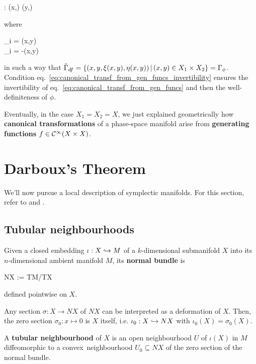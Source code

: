 \documentclass[main.tex]{subfiles}
\begin{document}
\begin{construction}
\begin{enumerate}
\begin{eqalign}
			\phi : (x,\xi) \mapsto (y,\eta)
		\end{eqalign}
		where
		\begin{eqalign}
		\label{eq:canonical_transf_from_gen_funcs}
			\begin{cases}
				\xi_i = (x,y)\\
				\eta_i = -(x,y)
			\end{cases}
		\end{eqalign}
		in such a way that $\tilde\Gamma_{df} = \{(x,y,\xi (x,y),\eta (x,y)) \,|\, (x,y) \in X_1 \times X_2\} = \Gamma_\phi$. Condition eq.~\eqref{eq:canonical_transf_from_gen_funcs_invertibility} ensures the invertibility of eq.~\eqref{eq:canonical_transf_from_gen_funcs} and then the well-definiteness of $\phi$. 
	\end{enumerate}
\end{construction}

Eventually, in the case $X_1 = X_2 = X$, we just explained geometrically how \textbf{canonical transformations} of a phase-space manifold arise from \textbf{generating functions} $f \in \mathcal{C}^\infty(X \times X)$.

\section{Darboux's Theorem}
We'll now pursue a local description of symplectic manifolds. For this section, refer to \cite[Section 1.4]{cannas2005symplectic} and \cite[Section 1.5]{cannas2005symplectic}.

\subsection{Tubular neighbourhoods}
\begin{definition}
	Given a closed embedding ${\iota : X \hookrightarrow M}$ of a $k$-dimensional submanifold $X$ into its $n$-dimensional ambient manifold $M$, its \textbf{normal bundle} is
	\begin{eqalign}
		NX := TM/TX
	\end{eqalign}
	defined pointwise on $X$.
\end{definition}

Any section $\sigma: X \to NX$ of $NX$ can be interpreted as a deformation of $X$. Then, the zero section $\sigma_0: x \mapsto 0$ is $X$ itself, i.e. $\iota_0 : X \hookrightarrow NX$ with $\iota_0 (X) = \sigma_0 (X)$.

\begin{definition}
	A \textbf{tubular neighbourhood} of $X$ is an open neighbourhood $U$ of $\iota(X)$ in $M$ diffeomorphic to a convex\footnotemark\ neighbourhood $U_0 \subseteq NX$ of the zero section of the normal bundle.
\end{definition}
\end{document}
